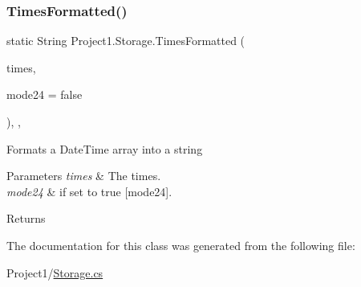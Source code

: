 \subsubsection{\texorpdfstring{Times\+Formatted()}{TimesFormatted()}}
{\footnotesize\ttfamily static String Project1.\+Storage.\+Times\+Formatted (\begin{DoxyParamCaption}\item[{Date\+Time \mbox{[}$\,$\mbox{]}}]{times,  }\item[{bool}]{mode24 = {\ttfamily false} }\end{DoxyParamCaption})\hspace{0.3cm}{\ttfamily [inline]}, {\ttfamily [static]}, {\ttfamily [package]}}



Formats a Date\+Time array into a string 


\begin{DoxyParams}{Parameters}
{\em times} & The times.\\
\hline
{\em mode24} & if set to {\ttfamily true} \mbox{[}mode24\mbox{]}.\\
\hline
\end{DoxyParams}
\begin{DoxyReturn}{Returns}

\end{DoxyReturn}


The documentation for this class was generated from the following file\+:\begin{DoxyCompactItemize}
\item 
Project1/\hyperlink{Storage_8cs}{Storage.\+cs}\end{DoxyCompactItemize}

